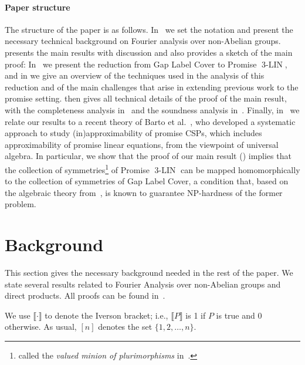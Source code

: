 \documentclass[a4paper,11pt]{article}
\theoremstyle{definition}
\newcommand{\eq}{\ensuremath{\operatorname{3-LIN}}}
\begin{document}
\paragraph{Paper structure}
The structure of the paper is as follows. 
In~ we set the notation and present the necessary technical background on Fourier analysis over non-Abelian groups.
 presents the main results with discussion and also provides a sketch of the main proof: In~ we present the reduction from Gap Label
Cover to Promise $\eq$,
and in
 we give an overview of the techniques used in the analysis of
this reduction and of the main challenges that arise in extending previous work
to the promise setting. 
 then gives all technical details of the proof of the main result, with the completeness analysis in~ and the soundness analysis in~.
Finally, in~ we relate our results to a recent
theory of Barto et al.~\cite{Barto24:lics}, who developed a systematic approach
to study (in)approximability of promise CSPs, which includes approximability of
promise linear equations, from the viewpoint of universal algebra. In
particular, we show that the proof of our main result () implies that the collection
of symmetries\footnote{called the \emph{valued minion of plurimorphisms}
in~\cite{Barto24:lics}.} of 
Promise $\eq$ 
can be mapped
homomorphically to the collection of symmetries of Gap Label Cover, a condition
that, based on the algebraic theory from~\cite{Barto24:lics}, is known to guarantee NP-hardness of the former problem.


\section{Background}\label{sec:background}

This section gives the necessary background needed in the rest of the paper. We state several results related to Fourier Analysis over non-Abelian groups
and direct products. All proofs can be found in~. \par

We use $\llbracket \cdot \rrbracket$ to denote the Iverson bracket; i.e.,
$\llbracket P\rrbracket$ is 1 if $P$ is true and $0$ otherwise.
As usual, $[n]$ denotes the set $\{1,2,\ldots,n\}$. \par
\end{document}
